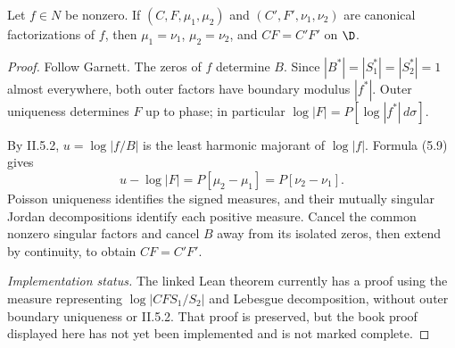 \begin{theorem}
  \label{thm:nevanlinna_factorization_uniqueness}
  \leanok
  \mainline
  Let $f\in N$ be nonzero. If $(C,F,\mu_1,\mu_2)$ and
  $(C',F',\nu_1,\nu_2)$ are canonical factorizations of $f$, then
  $\mu_1=\nu_1$, $\mu_2=\nu_2$, and $CF=C'F'$ on $\D$.
  \begin{proof}
    \leanok
    Follow Garnett. The zeros of $f$ determine $B$. Since
    $|B^*|=|S_1^*|=|S_2^*|=1$ almost everywhere, both outer factors have
    boundary modulus $|f^*|$. Outer uniqueness determines $F$ up to phase;
    in particular $\log|F|=P[\log|f^*|\,d\sigma]$.

    By II.5.2, $u=\log|f/B|$ is the least harmonic majorant of $\log|f|$.
    Formula (5.9) gives
    \[
      u-\log|F|=P[\mu_2-\mu_1]=P[\nu_2-\nu_1].
    \]
    Poisson uniqueness identifies the signed measures, and their mutually
    singular Jordan decompositions identify each positive measure.
    Cancel the common nonzero singular factors and cancel $B$ away from
    its isolated zeros, then extend by continuity, to obtain $CF=C'F'$.

    \emph{Implementation status.} The linked Lean theorem currently has a
    proof using the measure representing $\log|CFS_1/S_2|$ and Lebesgue
    decomposition, without outer boundary uniqueness or II.5.2. That proof
    is preserved, but the book proof displayed here has not yet been
    implemented and is not marked complete.
  \end{proof}
\end{theorem}

